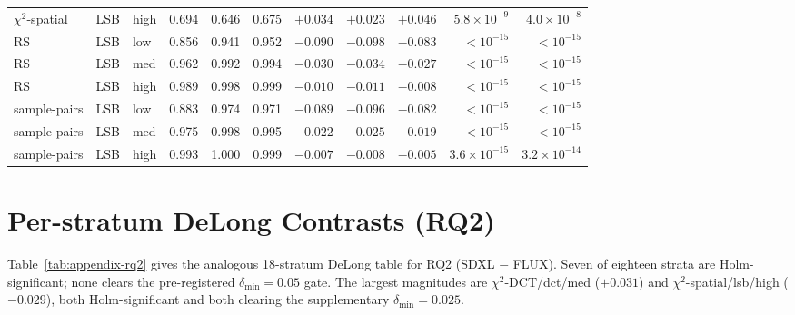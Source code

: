 \documentclass[10pt,twocolumn,a4paper]{article}
\begin{document}
\begin{table}[h]
\begin{tabular}{@{}l l l c c c r r r r r@{}}
$\chi^2$-spatial     & LSB & high   & 0.694 & 0.646 & 0.675 & $+0.034$ & $+0.023$ & $+0.046$ & $5.8\!\times\!10^{-9}$ & $4.0\!\times\!10^{-8}$ \\
RS                   & LSB & low    & 0.856 & 0.941 & 0.952 & $-0.090$ & $-0.098$ & $-0.083$ & $<\!10^{-15}$           & $<\!10^{-15}$ \\
RS                   & LSB & med    & 0.962 & 0.992 & 0.994 & $-0.030$ & $-0.034$ & $-0.027$ & $<\!10^{-15}$           & $<\!10^{-15}$ \\
RS                   & LSB & high   & 0.989 & 0.998 & 0.999 & $-0.010$ & $-0.011$ & $-0.008$ & $<\!10^{-15}$           & $<\!10^{-15}$ \\
sample-pairs         & LSB & low    & 0.883 & 0.974 & 0.971 & $-0.089$ & $-0.096$ & $-0.082$ & $<\!10^{-15}$           & $<\!10^{-15}$ \\
sample-pairs         & LSB & med    & 0.975 & 0.998 & 0.995 & $-0.022$ & $-0.025$ & $-0.019$ & $<\!10^{-15}$           & $<\!10^{-15}$ \\
sample-pairs         & LSB & high   & 0.993 & 1.000 & 0.999 & $-0.007$ & $-0.008$ & $-0.005$ & $3.6\!\times\!10^{-15}$ & $3.2\!\times\!10^{-14}$ \\
\bottomrule
\end{tabular}
\end{table}

\section{Per-stratum DeLong Contrasts (RQ2)}
\label{app:rq2-delong}
Table~\ref{tab:appendix-rq2} gives the analogous 18-stratum DeLong table for RQ2 (SDXL $-$ FLUX). Seven of eighteen strata are Holm-significant; none clears the pre-registered $\delta_\text{min}\!=\!0.05$ gate. The largest magnitudes are $\chi^2$-DCT/dct/med ($+0.031$) and $\chi^2$-spatial/lsb/high ($-0.029$), both Holm-significant and both clearing the supplementary $\delta_\text{min}\!=\!0.025$.
\end{document}

